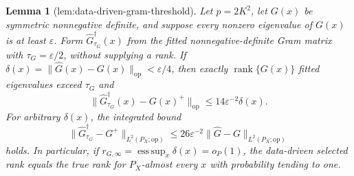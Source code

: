 \documentclass{article}
\newtheorem{lemma}{Lemma}
\begin{document}
\begin{lemma}[lem:data-driven-gram-threshold]\label{lem:data-driven-gram-threshold}
Let \(p=2K^2\), let \(G(x)\) be symmetric nonnegative definite, and suppose every nonzero eigenvalue of \(G(x)\) is at least \(\varepsilon\).  Form \(\widehat G_{\tau_G}^{\dagger}(x)\) from the fitted nonnegative-definite Gram matrix with \(\tau_G=\varepsilon/2\), without supplying a rank.  If \(\delta(x)=\|\widehat G(x)-G(x)\|_{\mathrm{op}}<\varepsilon/4\), then exactly \(\operatorname{rank}\{G(x)\}\) fitted eigenvalues exceed \(\tau_G\) and
\[
 \|\widehat G_{\tau_G}^{\dagger}(x)-G(x)^+\|_{\mathrm{op}}
 \leq 14\varepsilon^{-2}\delta(x).
\]
For arbitrary \(\delta(x)\), the integrated bound
\[
 \|\widehat G_{\tau_G}^{\dagger}-G^+\|_{L^2(P_X;\mathrm{op})}
 \leq 26\varepsilon^{-2}
 \|\widehat G-G\|_{L^2(P_X;\mathrm{op})}
\]
holds.  In particular, if \(r_{G,\infty}=\operatorname*{ess\,sup}_x\delta(x)=o_P(1)\), the data-driven selected rank equals the true rank for \(P_X\)-almost every \(x\) with probability tending to one.
\end{lemma}
\end{document}
